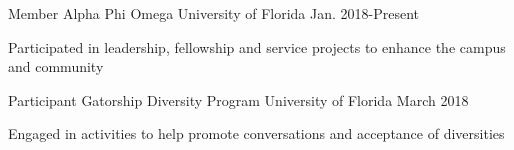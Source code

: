 

\begin{cventries}

  \cventry
    {Member} %
    {Alpha Phi Omega} %
    {University of Florida} %
    {Jan. 2018-Present} %
    {
      \begin{cvitems} %
        \item {Participated in leadership, fellowship and service projects to enhance the campus and community }
      \end{cvitems}
    }

  \cventry
    {Participant} %
    {Gatorship Diversity Program} %
    {University of Florida} %
    {March 2018} %
    {
      \begin{cvitems} %
      \item {Engaged in activities to help promote conversations and acceptance of diversities}

      \end{cvitems}
    }


\end{cventries}
